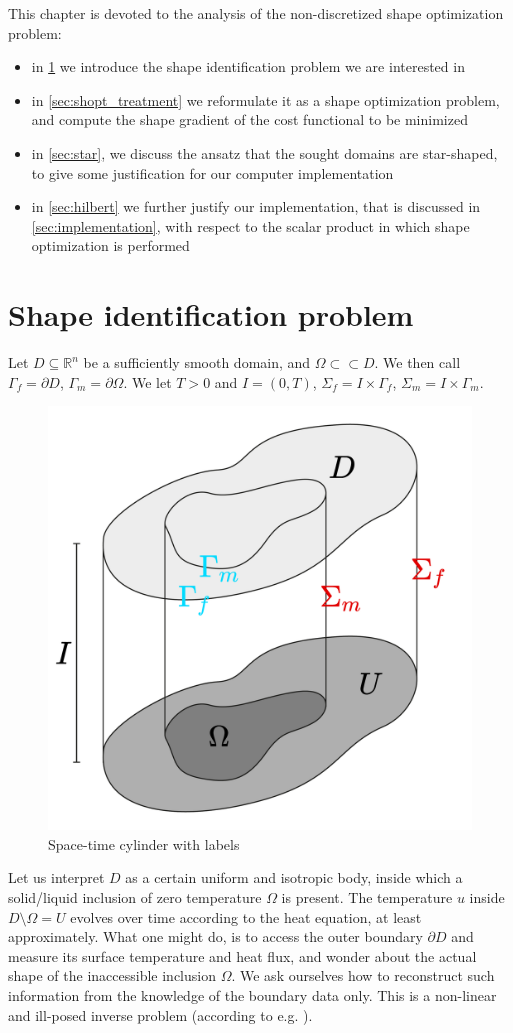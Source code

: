 \documentclass[english,a4paper,9pt,oneside]{scrbook}	%
\theoremstyle{break}
\theoremstyle{remark}
\newcommand{\mR}{\mathbb{R}}
\newcommand{\cc}{\subset\subset}
\begin{document}
This chapter is devoted to the analysis of the non-discretized shape optimization problem:

\begin{itemize}
	\item in \cref{sec:shid} we introduce the shape identification problem we are interested in
	\item in \cref{sec:shopt_treatment} we reformulate it as a shape optimization problem, and compute the shape gradient of the cost functional to be minimized
	\item in \cref{sec:star}, we discuss the ansatz that the sought domains are star-shaped, to give some justification for our computer implementation
	\item in \cref{sec:hilbert} we further justify our implementation, that is discussed in \cref{sec:implementation}, with respect to the scalar product in which shape optimization is performed
\end{itemize}

\section{Shape identification problem}
\label{sec:shid}

Let $D\subseteq\mR^n$ be a sufficiently smooth domain, and $\Omega \cc D$. We then call $\Gamma_f=\partial D$, $\Gamma_m = \partial \Omega$. We let $T>0$ and $I = (0,T)$, $\Sigma_f=I\times \Gamma_f$, $\Sigma_m=I\times \Gamma_m$.

\begin{figure}[H]
\centering
\includegraphics[width=0.25\columnwidth]{Images/Domains.pdf}
\caption{Space-time cylinder with labels}\label{fig:space_time}
\end{figure}

Let us interpret $D$ as a certain uniform and isotropic body, inside which a solid/liquid inclusion of zero temperature $\Omega$ is present. The temperature $u$ inside $D\setminus \Omega = U$ evolves over time according to the heat equation, at least approximately. What one might do, is to access the outer boundary $\partial D$ and measure its surface temperature and heat flux, and wonder about the actual shape of the inaccessible inclusion $\Omega$. We ask ourselves how to reconstruct such information from the knowledge of the boundary data only. This is a non-linear and ill-posed inverse problem (according to e.g. \cite{harbrecht}). 
\end{document}
